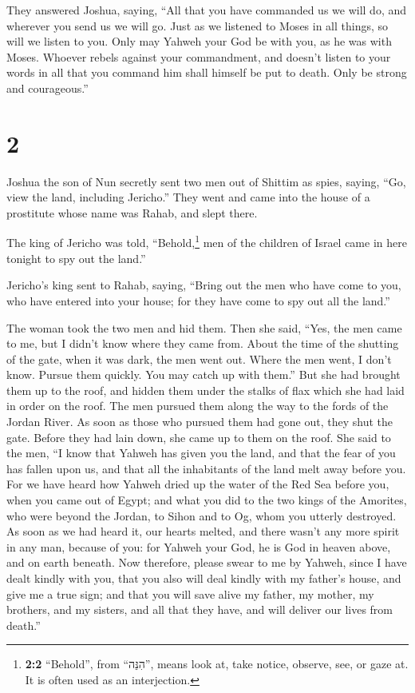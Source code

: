 They answered Joshua, saying, ``All that you have
commanded us we will do, and wherever you send us we will go.
 Just as we listened to Moses in all things, so will we
listen to you. Only may Yahweh your God be with you, as he was with
Moses.  Whoever rebels against your commandment, and
doesn't listen to your words in all that you command him shall himself
be put to death. Only be strong and courageous.''

\hypertarget{section-1}{%
\section{2}\label{section-1}}

 Joshua the son of Nun secretly sent two men out of
Shittim as spies, saying, ``Go, view the land, including Jericho.'' They
went and came into the house of a prostitute whose name was Rahab, and
slept there.

 The king of Jericho was told, ``Behold,\footnote{\textbf{2:2}
  ``Behold'', from ``הִנֵּה'', means look at, take notice, observe, see,
  or gaze at. It is often used as an interjection.} men of the children
of Israel came in here tonight to spy out the land.''

 Jericho's king sent to Rahab, saying, ``Bring out the men
who have come to you, who have entered into your house; for they have
come to spy out all the land.''

 The woman took the two men and hid them. Then she said,
``Yes, the men came to me, but I didn't know where they came from.
 About the time of the shutting of the gate, when it was
dark, the men went out. Where the men went, I don't know. Pursue them
quickly. You may catch up with them.''  But she had
brought them up to the roof, and hidden them under the stalks of flax
which she had laid in order on the roof.  The men pursued
them along the way to the fords of the Jordan River. As soon as those
who pursued them had gone out, they shut the gate.  Before
they had lain down, she came up to them on the roof.  She
said to the men, ``I know that Yahweh has given you the land, and that
the fear of you has fallen upon us, and that all the inhabitants of the
land melt away before you.  For we have heard how Yahweh
dried up the water of the Red Sea before you, when you came out of
Egypt; and what you did to the two kings of the Amorites, who were
beyond the Jordan, to Sihon and to Og, whom you utterly destroyed.
 As soon as we had heard it, our hearts melted, and there
wasn't any more spirit in any man, because of you: for Yahweh your God,
he is God in heaven above, and on earth beneath.  Now
therefore, please swear to me by Yahweh, since I have dealt kindly with
you, that you also will deal kindly with my father's house, and give me
a true sign;  and that you will save alive my father, my
mother, my brothers, and my sisters, and all that they have, and will
deliver our lives from death.''

